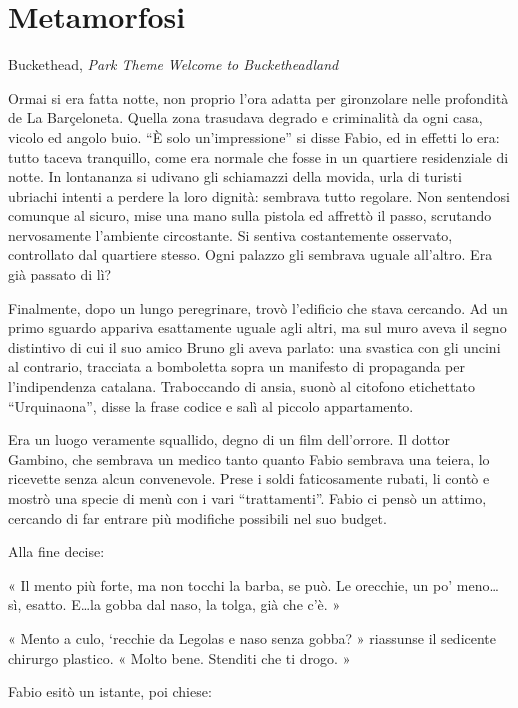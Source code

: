 \chapter{Metamorfosi}

\begin{chapquote}{Buckethead, \textit{Park Theme}}
	\textit{Welcome to Bucketheadland
	}
\end{chapquote}

Ormai si era fatta notte, non proprio l'ora adatta per gironzolare nelle profondità de La Barçeloneta. Quella zona trasudava degrado e criminalità da ogni casa, vicolo ed angolo buio. ``È solo un'impressione'' si disse Fabio, ed in effetti lo era: tutto taceva tranquillo, come era normale che fosse in un quartiere residenziale di notte. In lontananza si udivano gli schiamazzi della movida, urla di turisti ubriachi intenti a perdere la loro dignità: sembrava tutto regolare. Non sentendosi comunque al sicuro, mise una mano sulla pistola ed affrettò il passo, scrutando nervosamente l'ambiente circostante. Si sentiva costantemente osservato, controllato dal quartiere stesso. Ogni palazzo gli sembrava uguale all'altro. Era già passato di lì?

Finalmente, dopo un lungo peregrinare, trovò l'edificio che stava cercando. Ad un primo sguardo appariva esattamente uguale agli altri, ma sul muro aveva il segno distintivo di cui il suo amico Bruno gli aveva parlato: una svastica con gli uncini al contrario, tracciata a bomboletta sopra un manifesto di propaganda per l'indipendenza catalana. Traboccando di ansia, suonò al citofono etichettato ``Urquinaona'', disse la frase codice e salì al piccolo appartamento.

Era un luogo veramente squallido, degno di un film dell'orrore. Il dottor Gambino, che sembrava un medico tanto quanto Fabio sembrava una teiera, lo ricevette senza alcun convenevole. Prese i soldi faticosamente rubati, li contò e mostrò una specie di menù con i vari ``trattamenti''. Fabio ci pensò un attimo, cercando di far entrare più modifiche possibili nel suo budget.

Alla fine decise:

« Il mento più forte, ma non tocchi la barba, se può. Le orecchie, un po' meno\ldots sì, esatto. E\ldots la gobba dal naso, la tolga, già che c'è. »

« Mento a culo,  `recchie da Legolas e naso senza gobba? » riassunse il sedicente chirurgo plastico. « Molto bene. Stenditi che ti drogo. »

Fabio esitò un istante, poi chiese:

